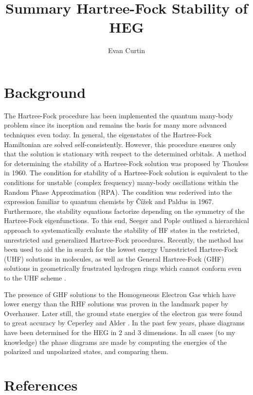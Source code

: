 \documentclass{revtex4}
\begin{document}
\title{Summary Hartree-Fock Stability of HEG}
\author{Evan Curtin}
\maketitle


\section{Background}
    The Hartree-Fock procedure has been implemented the quantum many-body problem since its inception and remains the basis for many more advanced techniques even today. In general, the eigenstates of the Hartree-Fock Hamiltonian are solved self-consistently. However, this procedure ensures only that the solution is stationary with respect to the determined orbitals. A method for determining the stability of a Hartree-Fock solution was proposed by Thouless in 1960\cite{Thouless1960}. The condition for stability of a Hartree-Fock solution is equivalent to the conditions for unstable (complex frequency) many-body oscillations within the Random Phase Approximation (RPA). The condition was rederived into the expression familiar to quantum chemists by Čížek and Paldus in 1967\cite{Cizek1967}. Furthermore, the stability equations factorize depending on the symmetry of the Hartree-Fock eigenfunctions. To this end, Seeger and Pople outlined a hierarchical approach to systematically evaluate the stability of HF states in the restricted, unrestricted and generalized Hartree-Fock procedures\cite{Seeger1977}. Recently, the method has been used to aid the in search for the lowest energy Unrestricted Hartree-Fock (UHF) solutions in molecules, as well as the General Hartree-Fock (GHF) solutions in geometrically frustrated hydrogen rings which cannot conform even to the UHF scheme \cite{Pulay2016}\cite{Goings2015}.
    
    The presence of GHF solutions to the Homogeneous Electron Gas which have lower energy than the RHF solutions was proven in the landmark paper by Overhauser\cite{Overhauser1962}. Later still, the ground state energies of the electron gas were found to great accuracy by Ceperley and Alder \cite{Ceperley1980}. In the past few years, phase diagrams have been determined for the HEG in 2 and 3 dimensions\cite{Delyon2008}\cite{Bernu2011}\cite{Baguet2013}. In all cases (to my knowledge) the phase diagrams are made by computing the energies of the polarized and unpolarized states, and comparing them. 

\section{References}

\end{document}
